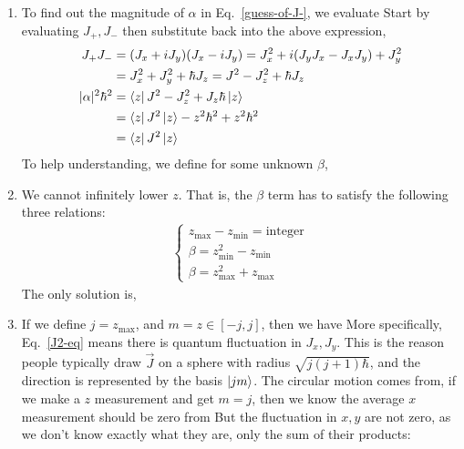 \documentclass{school-22.101-notes}
\begin{document}
\begin{enumerate}
\begin{enumerate}
  \item To find out the magnitude of $\alpha$ in Eq.~\ref{guess-of-J-}, we evaluate
    Start by evaluating $J_+, J_-$ then substitute back into the above expression, 
    \begin{align}
      J_+ J_- &= (J_x + i J_y) (J_x - iJ_y) = J_x^2 + i (J_y J_x - J_x J_y) + J_y^2 \\
      &= J_x^2 + J_y^2 + \hbar J_z = J^2 - J_z^2 + \hbar J_z \\
      |\alpha|^2 \hbar^2 &= \left< z \right| J^2 - J_z^2 + J_z \hbar \left| z \right> \\
      &= \left< z \right| J^2 \left| z \right> - z^2 \hbar^2 + z^2 \hbar^2 \\
      &= \left< z \right| J^2 \left| z \right>
    \end{align}
    To help understanding, we define for some unknown $\beta$, 

  \item We cannot infinitely lower $z$. That is, the $\beta$ term has to satisfy the following three relations: 
    \begin{align}
      \left\{ \begin{array}{c} 
        z_{\max} - z_{\min} = \mathrm{integer}  \\
        \beta = z_{\min}^2 - z_{\min}  \\
        \beta = z_{\max}^2 + z_{\max}
      \end{array}
      \right. 
    \end{align}
    The only solution is, 

  \item If we define $j = z_{\max}$, and $m = z \in [-j, j]$, then we have 
    More specifically, 
    Eq.~\ref{J2-eq} means there is quantum fluctuation in $J_x, J_y$. This is the reason people typically draw $\vec{J}$ on a sphere with radius $\sqrt{j(j+1) \hbar}$, and the direction is represented by the basis $\left| jm \right>$. The circular motion comes from, if we make a $z$ measurement and get $m=j$, then we know the average $x$ measurement should be zero from 
        But the fluctuation in $x,y$ are not zero, as we don't know exactly what they are, only the sum of their products: 
  \end{enumerate}
\end{enumerate}
\end{document}
